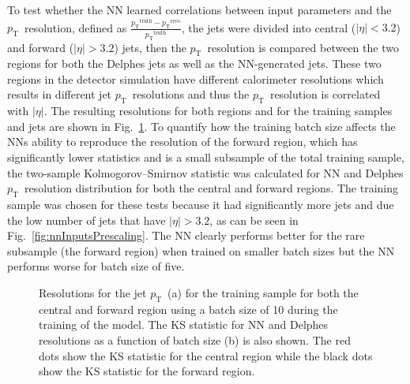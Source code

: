 \documentclass[showpacs,showkeys,preprint,prd,nofootinbib,linenumbers,12pt,superscriptaddress]{revtex4-1}
\def\pt{\ensuremath{p_{\mathrm{T}}}}
\def\ptRes{\ensuremath{\pt^{\mathrm{truth}}-\pt^{\mathrm{reco}}}}
\begin{document}
To test whether the NN learned correlations between input parameters and the \pt\ resolution, defined as $\frac{\ptRes}{\pt^{\text{truth}}}$, the jets were divided into central ($|\eta|<3.2$) and forward ($|\eta|>3.2$) jets, then the \pt\ resolution is compared between the two regions for both the Delphes jets as well as the NN-generated jets. These two regions in the detector simulation have different calorimeter resolutions which results in different jet \pt\ resolutions and thus the \pt\ resolution is correlated with $|\eta|$. The resulting resolutions for both regions and for the training samples and jets are shown in Fig.~\ref{fig:nnRes}. To quantify how the training batch size affects the NNs ability to reproduce the resolution of the forward region, which has significantly lower statistics and is a small subsample of the total training sample, the two-sample Kolmogorov–Smirnov statistic was calculated for NN and Delphes \pt\ resolution distribution for both the central and forward regions. The training sample was chosen for these tests because it had significantly more jets and due the low number of jets that have $|\eta|>3.2$, as can be seen in Fig.~\ref{fig:nnInputsPrescaling}. The NN clearly performs better for the rare subsample (the forward region) when trained on smaller batch sizes but the NN performs worse for batch size of five.

\begin{figure}[htb]
  \caption{Resolutions for the jet \pt\ (a) for the training sample for both the central and forward region using a batch size of 10 during the training of the model. The KS statistic for NN and Delphes resolutions as a function of batch size (b) is also shown. The red dots show the KS statistic for the central region while the black dots show the KS statistic for the forward region. }
  \label{fig:nnRes}
\end{figure}
\end{document}
